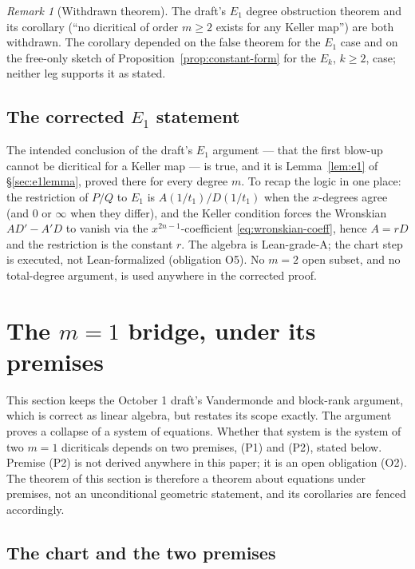\documentclass[a4paper,11pt]{article}
\theoremstyle{plain}
\theoremstyle{definition}
\theoremstyle{remark}
\newtheorem{remark}[theorem]{Remark}
\begin{document}
\begin{remark}[Withdrawn theorem]
The draft's $E_1$ degree obstruction theorem and its corollary (``no dicritical of order
$m \geq 2$ exists for any Keller map'') are both withdrawn. The corollary depended on the false theorem for the $E_1$ case and on the
free-only sketch of Proposition~\ref{prop:constant-form} for the $E_k$, $k \geq 2$, case;
neither leg supports it as stated.
\end{remark}

\subsection{The corrected \texorpdfstring{$E_1$}{E1} statement}

The intended conclusion of the draft's $E_1$ argument --- that the first blow-up cannot be
dicritical for a Keller map --- is true, and it is Lemma~\ref{lem:e1} of
\S\ref{sec:e1lemma}, proved there for every degree $m$. To recap the logic in one place: the
restriction of $P/Q$ to $E_1$ is $A(1/t_1)/D(1/t_1)$ when the $x$-degrees agree (and $0$ or
$\infty$ when they differ), and the Keller condition forces the Wronskian $AD' - A'D$ to
vanish via the $x^{2n-1}$-coefficient \eqref{eq:wronskian-coeff}, hence $A = rD$ and the
restriction is the constant $r$. The algebra is Lean-grade-A; the chart step is executed, not
Lean-formalized (obligation O5). No $m = 2$ open subset, and no total-degree argument, is
used anywhere in the corrected proof.

\section{The \texorpdfstring{$m=1$}{m=1} bridge, under its premises}\label{sec:bridge}

This section keeps the October 1 draft's Vandermonde and block-rank argument, which is correct
as linear algebra, but restates its scope exactly. The argument proves a collapse of a system
of equations. Whether that system is the system of two $m = 1$ dicriticals depends on two
premises, (P1) and (P2), stated below. Premise (P2) is not derived anywhere in this paper; it
is an open obligation (O2). The theorem of this section is therefore a theorem about equations
under premises, not an unconditional geometric statement, and its corollaries are fenced
accordingly.

\subsection{The chart and the two premises}
\end{document}
